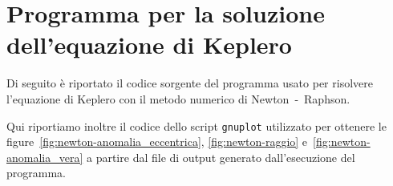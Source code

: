 \chapter{Programma per la soluzione dell'equazione di Keplero}
\label{cha:soluzione-keplero}

Di seguito è riportato il codice sorgente del programma usato per risolvere
l'equazione di Keplero con il metodo numerico di Newton~-~Raphson.
% 

Qui riportiamo inoltre il codice dello script \verb|gnuplot| utilizzato per
ottenere le figure~\ref{fig:newton-anomalia_eccentrica},
\ref{fig:newton-raggio} e~\ref{fig:newton-anomalia_vera} a partire dal file di
output generato dall'esecuzione del programma.


